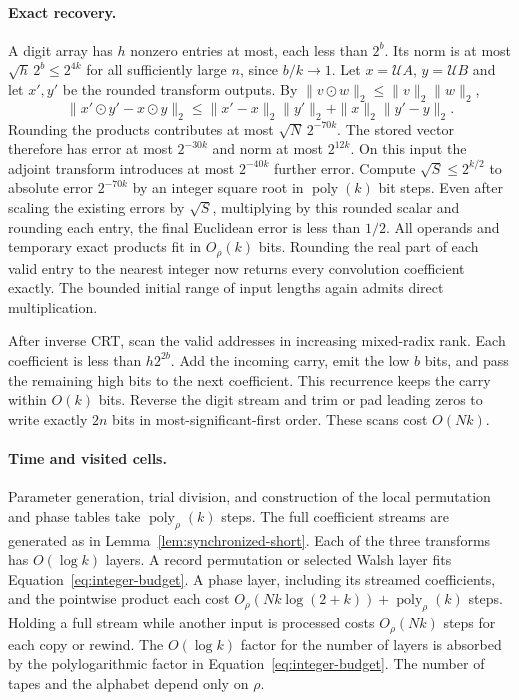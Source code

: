 \paragraph{Exact recovery.}
A digit array has \(h\) nonzero entries at most, each less than \(2^b\).
Its norm is at most \(\sqrt h\,2^b\le 2^{4k}\) for all sufficiently
large \(n\), since \(b/k\to1\). Let \(x=\mathcal U A\),
\(y=\mathcal U B\) and let \(x',y'\) be the rounded transform outputs.
By \(\|v\odot w\|_2\le\|v\|_2\|w\|_2\),
\[
 \|x'\odot y'-x\odot y\|_2
 \le \|x'-x\|_2\|y'\|_2+\|x\|_2\|y'-y\|_2.
\]
Rounding the products contributes at most \(\sqrt N\,2^{-70k}\).
The stored vector therefore has error at most \(2^{-30k}\) and norm
at most \(2^{12k}\). On this input the adjoint transform introduces
at most \(2^{-40k}\) further error. Compute \(\sqrt S\le2^{k/2}\) to
absolute error \(2^{-70k}\) by an integer square root in
\(\operatorname{poly}(k)\) bit steps. Even after scaling the existing
errors by \(\sqrt S\), multiplying by this rounded scalar and
rounding each entry, the final Euclidean error is less than \(1/2\).
All operands and temporary exact products fit in \(O_\rho(k)\) bits.
Rounding the real part of each valid entry to the nearest integer
now returns every convolution coefficient exactly. The bounded
initial range of input lengths again admits direct multiplication.

After inverse CRT, scan the valid addresses in increasing mixed-radix
rank. Each coefficient is less than \(h2^{2b}\). Add the incoming
carry, emit the low \(b\) bits, and pass the remaining high bits
to the next coefficient. This recurrence keeps the carry within
\(O(k)\) bits. Reverse the digit stream and trim or pad leading zeros
to write exactly \(2n\) bits in most-significant-first order. These
scans cost \(O(Nk)\).

\paragraph{Time and visited cells.}
Parameter generation, trial division, and construction of the local
permutation and phase tables take \(\operatorname{poly}_\rho(k)\)
steps. The full coefficient streams are generated as in
Lemma~\ref{lem:synchronized-short}. Each of the three transforms has
\(O(\log k)\) layers. A record permutation or selected Walsh layer
fits Equation~\eqref{eq:integer-budget}. A phase layer, including its
streamed coefficients, and the pointwise product each cost
\(O_\rho(Nk\log(2+k))+\operatorname{poly}_\rho(k)\) steps. Holding a
full stream while another input is processed costs \(O_\rho(Nk)\)
steps for each copy or rewind. The \(O(\log k)\) factor for the number
of layers is absorbed by the polylogarithmic factor in
Equation~\eqref{eq:integer-budget}. The number of tapes and the
alphabet depend only on \(\rho\).

